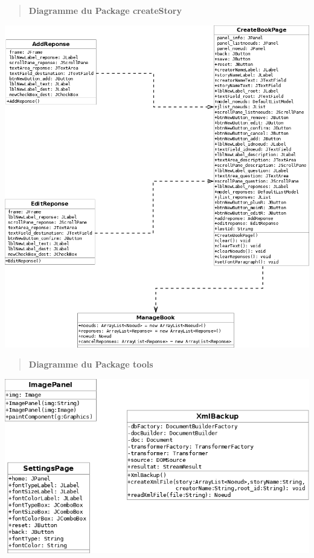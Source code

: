\documentclass[12pt]{article}
\begin{document}
	
		\begin{center}
		\begin{verse}
		    \begin{center}
		       \textbf{Diagramme du Package createStory} 
		    \end{center}
		\end{verse}
			\newcommand{\umlscale}{0.4}
			\includegraphics[scale=\umlscale]{./images/packageCreateStory.png}
		\end{center}
	    \newpage
		\begin{center}
		\begin{verse}
		    \begin{center}
		       \textbf{Diagramme du Package tools} 
		    \end{center}
		\end{verse}
			\newcommand{\umlscale}{0.4}
			\includegraphics[scale=\umlscale]{./images/packageTools.png}
		\end{center}
\end{document}
